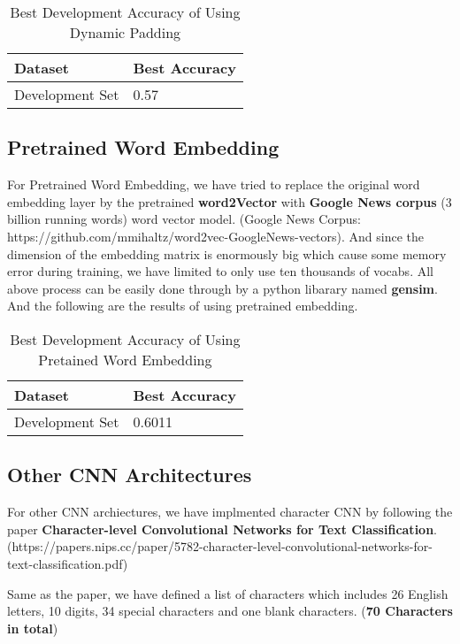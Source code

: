 \documentclass{article}
\begin{document}
\begin{table}[htb]
	\caption{Best Development Accuracy of Using Dynamic Padding}
	\label{sample-table}
	\centering
	\begin{tabular}{ll}
		\toprule
		\cmidrule{1-2}
		Dataset & Best Accuracy\\
		\midrule
		Development Set & 0.57  \\
		\bottomrule
	\end{tabular}
\end{table}


\subsection{Pretrained Word Embedding}
For Pretrained Word Embedding, we have tried to replace the original word embedding layer by the pretrained \textbf{word2Vector} with \textbf{Google News corpus} (3 billion running words) word vector model. (Google News Corpus: https://github.com/mmihaltz/word2vec-GoogleNews-vectors). And since the dimension of the embedding matrix is enormously big which cause some memory error during training, we have limited to only use ten thousands of vocabs. All above process can be easily done through by a python libarary named \textbf{gensim}. And the following are the results of using pretrained embedding.

\begin{table}[htb]
	\caption{Best Development Accuracy of Using Pretained Word Embedding}
	\label{sample-table}
	\centering
	\begin{tabular}{ll}
		\toprule
		\cmidrule{1-2}
		Dataset & Best Accuracy\\
		\midrule
		Development Set & 0.6011  \\
		\bottomrule
	\end{tabular}
\end{table}

\pagebreak

\subsection{Other CNN Architectures}
For other CNN archiectures, we have implmented character CNN by following the paper \textbf{Character-level Convolutional Networks for Text Classification}. (https://papers.nips.cc/paper/5782-character-level-convolutional-networks-for-text-classification.pdf) 

Same as the paper, we have defined a list of characters which includes 26 English letters, 10 digits, 34 special characters and one blank characters. (\textbf{70 Characters in total})
\end{document}
